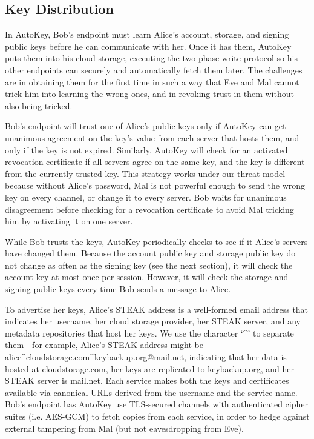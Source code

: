 \subsection{Key Distribution}
In AutoKey, Bob's endpoint must learn Alice's account, storage, and signing public keys before he can communicate with her.  Once it has them, AutoKey puts them into his cloud storage, executing the two-phase write protocol so his other endpoints can securely and automatically fetch them later.  The challenges are in obtaining them for the first time in such a way that Eve and Mal cannot trick him into learning the wrong ones, and in revoking trust in them without also being tricked.

Bob's endpoint will trust one of Alice's public keys only if AutoKey can get unanimous agreement on the key's value from each server that hosts them, and only if the key is not expired.  Similarly, AutoKey will check for an activated revocation certificate if all servers agree on the same key, and the key is different from the currently trusted key.  This strategy works under our threat model because without Alice's password, Mal is not powerful enough to send the wrong key on every channel, or change it to every server.  Bob waits for unanimous disagreement before checking for a revocation certificate to avoid Mal tricking him by activating it on one server.

While Bob trusts the keys, AutoKey periodically checks to see if it Alice's servers have changed them.  Because the account public key and storage public key do not change as often as the signing key (see the next section), it will check the account key at most once per session.  However, it will check the storage and signing public keys every time Bob sends a message to Alice.

To advertise her keys, Alice's STEAK address is a well-formed email address that indicates her username, her cloud storage provider, her STEAK server, and any metadata repositories that host her keys.  We use the character `\^{}' to separate them---for example, Alice's STEAK address might be alice\^{}cloudstorage.com\^{}keybackup.org@mail.net, indicating that her data is hosted at cloudstorage.com, her keys are replicated to keybackup.org, and her STEAK server is mail.net.  Each service makes both the keys and certificates available via canonical URLs derived from the username and the service name.  Bob's endpoint has AutoKey use TLS-secured channels with authenticated cipher suites (i.e. AES-GCM) to fetch copies from each service, in order to hedge against external tampering from Mal (but not eavesdropping from Eve).

